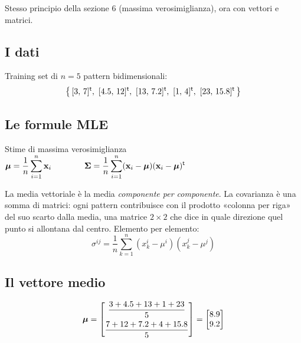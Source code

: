 
Stesso principio della sezione 6 (massima verosimiglianza), ora con vettori e matrici.

\subsection{I dati}
Training set di $n=5$ pattern bidimensionali:
\[
\left\{\,[3,\,7]\T,\ [4.5,\,12]\T,\ [13,\,7.2]\T,\ [1,\,4]\T,\ [23,\,15.8]\T\,\right\}
\]

\subsection{Le formule MLE}
\begin{formulat}{Stime di massima verosimiglianza}
$\displaystyle \bm{\mu}=\frac1n\sum_{i=1}^{n}\mathbf{x}_i
\qquad\qquad
\bm{\Sigma}=\frac1n\sum_{i=1}^{n}(\mathbf{x}_i-\bm{\mu})(\mathbf{x}_i-\bm{\mu})^{\mathsf{t}}$
\end{formulat}
\begin{intuizione}
La media vettoriale è la media \emph{componente per componente}. La covarianza è una somma di matrici: ogni pattern contribuisce con il prodotto «colonna per riga» del suo scarto dalla media, una matrice $2\times2$ che dice in quale direzione quel punto si allontana dal centro. Elemento per elemento:
\[
\sigma^{ij}=\frac1n\sum_{k=1}^{n}(x_k^i-\mu^i)(x_k^j-\mu^j)
\]
\end{intuizione}

\subsection{Il vettore medio}
\begin{esempio}
\[
\bm{\mu}=\begin{bmatrix}\dfrac{3+4.5+13+1+23}{5}\\[8pt]\dfrac{7+12+7.2+4+15.8}{5}\end{bmatrix}=\begin{bmatrix}8.9\\9.2\end{bmatrix}
\]
\end{esempio}

